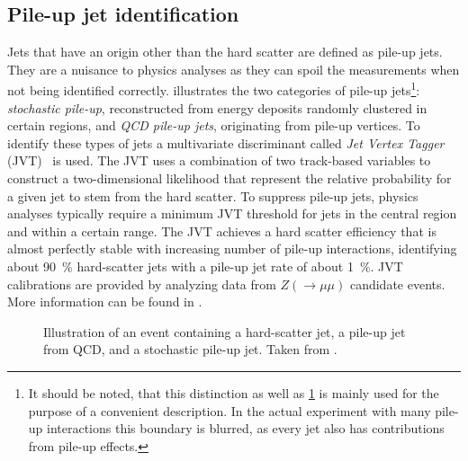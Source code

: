 \subsection{Pile-up jet identification}
Jets that have an origin other than the hard scatter are defined as pile-up jets.
They are a nuisance to physics analyses as they can spoil the measurements when not being identified correctly.
 illustrates the two categories of pile-up jets\footnote{It should be noted, that this distinction as well as \cref{fig:pile-up-jets-illustration} is mainly used for the purpose of a convenient description. In the actual experiment with many pile-up interactions this boundary is blurred, as every jet also has contributions from pile-up effects.}:
\emph{stochastic pile-up}, reconstructed from energy deposits randomly clustered in certain regions, and \emph{QCD pile-up jets}, originating from pile-up vertices.
To identify these types of jets a multivariate discriminant called \emph{Jet Vertex Tagger} (JVT)~\cite{ATLAS-CONF-2014-018} is used.
The JVT uses a combination of two track-based variables to construct a two-dimensional likelihood that represent the relative probability for a given jet to stem from the hard scatter.
To suppress pile-up jets, physics analyses typically require a minimum JVT threshold for jets in the central region  and within a certain \pT range.
The JVT achieves a hard scatter efficiency that is almost perfectly stable with increasing number of pile-up interactions, identifying about \SI{90}{\percent} hard-scatter jets with a pile-up jet rate of about \SI{1}{\percent}.
JVT calibrations are provided by analyzing data from $Z (\rightarrow \mu\mu)$ candidate events.
More information can be found in .


\begin{figure}
    \caption{Illustration of an event containing a hard-scatter jet, a pile-up jet from QCD, and a stochastic pile-up jet. Taken from .}
    \label{fig:pile-up-jets-illustration}
\end{figure}


